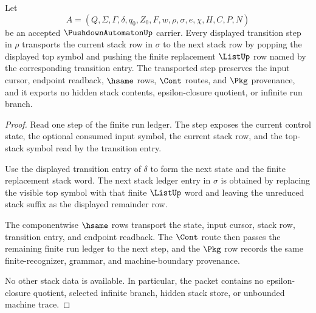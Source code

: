 \begin{theorem}
\label{thm:pushdown-automaton-stack-transition-stability}
Let
$$
A=(Q,\Sigma,\Gamma,\delta,q_0,Z_0,F,w,\rho,\sigma,e,\chi,H,C,P,N)
$$
be an accepted $\PushdownAutomatonUp$ carrier. Every displayed transition step
in $\rho$ transports the current stack row in $\sigma$ to the next stack row
by popping the displayed top symbol and pushing the finite replacement
$\ListUp$ row named by the corresponding transition entry. The transported
step preserves the input cursor, endpoint readback, $\hsame$ rows, $\Cont$
routes, and $\Pkg$ provenance, and it exports no hidden stack contents,
epsilon-closure quotient, or infinite run branch.
\end{theorem}
\begin{proof}
Read one step of the finite run ledger. The step exposes the current control
state, the optional consumed input symbol, the current stack row, and the
top-stack symbol read by the transition entry.

Use the displayed transition entry of $\delta$ to form the next state and the
finite replacement stack word. The next stack ledger entry in $\sigma$ is
obtained by replacing the visible top symbol with that finite $\ListUp$ word
and leaving the unreduced stack suffix as the displayed remainder row.

The componentwise $\hsame$ rows transport the state, input cursor, stack row,
transition entry, and endpoint readback. The $\Cont$ route then passes the
remaining finite run ledger to the next step, and the $\Pkg$ row records the
same finite-recognizer, grammar, and machine-boundary provenance.

No other stack data is available. In particular, the packet contains no
epsilon-closure quotient, selected infinite branch, hidden stack store, or
unbounded machine trace.
\end{proof}


